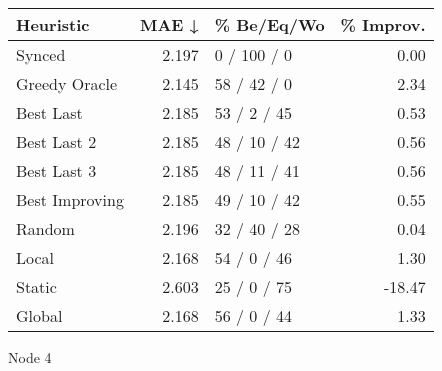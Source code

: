 \begin{tabular}{lrlr}
\toprule
\textbf{Heuristic} & \textbf{MAE ↓} & \textbf{\% Be/Eq/Wo} & \textbf{\% Improv.} \\
\midrule
            Synced &          2.197 &          0 / 100 / 0 &                0.00 \\
     Greedy Oracle &          2.145 &          58 / 42 / 0 &                2.34 \\
         Best Last &          2.185 &          53 / 2 / 45 &                0.53 \\
       Best Last 2 &          2.185 &         48 / 10 / 42 &                0.56 \\
       Best Last 3 &          2.185 &         48 / 11 / 41 &                0.56 \\
    Best Improving &          2.185 &         49 / 10 / 42 &                0.55 \\
            Random &          2.196 &         32 / 40 / 28 &                0.04 \\
             Local &          2.168 &          54 / 0 / 46 &                1.30 \\
            Static &          2.603 &          25 / 0 / 75 &              -18.47 \\
            Global &          2.168 &          56 / 0 / 44 &                1.33 \\
\bottomrule
\end{tabular}
\caption{Node 4}
\label{tab:hr_iid_lr01_le1_bs2_4}
